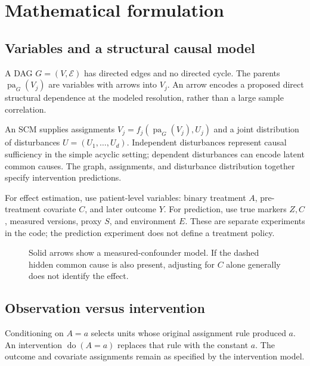 \documentclass[11pt,oneside]{scrbook}
\begin{document}
\chapter{Mathematical formulation}
\section{Variables and a structural causal model}
\begin{definition}
A DAG $G=(V,\mathcal E)$ has directed edges and no directed cycle. The parents
$\operatorname{pa}_G(V_j)$ are variables with arrows into $V_j$. An arrow encodes
a proposed direct structural dependence at the modeled resolution, rather than a large
sample correlation.
\end{definition}

\begin{definition}
An SCM supplies assignments $V_j=f_j(\operatorname{pa}_G(V_j),U_j)$ and a joint
distribution of disturbances $U=(U_1,\ldots,U_d)$. Independent disturbances represent
causal sufficiency in the simple acyclic setting; dependent disturbances can encode
latent common causes. The graph, assignments, and disturbance distribution together
specify intervention predictions.
\end{definition}

For effect estimation, use patient-level variables: binary treatment $A$, pre-treatment
covariate $C$, and later outcome $Y$. For prediction, use true markers $Z,C$, measured
versions, proxy $S$, and environment $E$. These are separate experiments in the code;
the prediction experiment does not define a treatment policy.

\begin{figure}[ht]
\centering
{}
\caption{Solid arrows show a measured-confounder model. If the dashed hidden
common cause is also present, adjusting for $C$ alone generally does not identify the effect.}
\end{figure}

\section{Observation versus intervention}
Conditioning on $A=a$ selects units whose original assignment rule produced $a$.
An intervention $\operatorname{do}(A=a)$ replaces that rule with the constant $a$.
The outcome and covariate assignments remain as specified by the intervention model.
\end{document}

